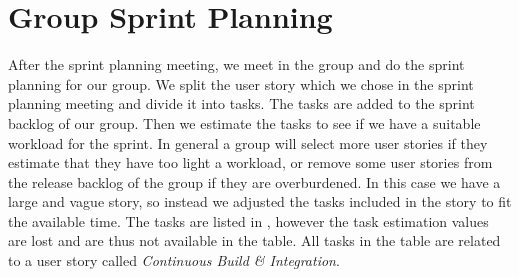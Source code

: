 \section{Group Sprint Planning}\label{sec:group_sprint_planning}
After the \bd sprint planning meeting, we meet in the group and do the sprint planning for our group. We split the user story which we chose in the \bd sprint planning meeting and divide it into tasks. The tasks are added to the sprint backlog of our group. Then we estimate the tasks to see if we have a suitable workload for the sprint. In general a group will select more user stories if they estimate that they have too light a workload, or remove some user stories from the release backlog of the group if they are overburdened. In this case we have a large and vague story, so instead we adjusted the tasks included in the story to fit the available time. The tasks are listed in , however the task estimation values are lost and are thus not available in the table. All tasks in the table are related to a user story called \emph{Continuous Build \& Integration}.

